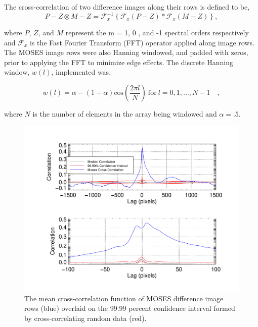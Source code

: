 \documentclass[]{solarphysics}
\begin{document}
\begin{article}
 	The cross-correlation of two difference images along their rows is defined to be,
	 	\begin{equation}
		 	P-Z \otimes M-Z = \mathcal{F}_x^{-1} \left\{\mathcal{F}_x\left(P-Z \right)*\mathcal{F}_x\left(M-Z \right)  \right\},
		 	\label{eqn:cross_correlate}
	 	\end{equation}
        
 	where $P$, $Z$, and $M$ represent the m = 1, 0 , and -1 spectral orders respectively and $\mathcal{F}_x$ is the Fast Fourier Transform (FFT) operator applied along image rows.  The MOSES image rows were also Hanning windowed, and padded with zeros, prior to applying the FFT to minimize edge effects.  The discrete Hanning window, $w(l)$, implemented was,
 	
		\begin{equation}
			w(l) = \alpha - (1-\alpha)\mathrm{cos}\left( \frac{2\pi l}{N} \right) \ \mathrm{for} \ l = 0,1,...,N-1 \quad ,
			\label{eqn:Hanning}
		\end{equation}



	where $N$ is the number of elements in the array being windowed and $\alpha = .5$.
 	
 	
 	
			 	
		\begin{figure}
		\centering
		\includegraphics[width=\linewidth]{images/sigtest_5}
		\caption{The mean cross-correlation function of MOSES difference image rows (blue) overlaid on the 99.99 percent confidence interval formed by cross-correlating random data (red). }
		\label{fig:sigtest}
		\end{figure}
 	

\end{article}
\end{document}
